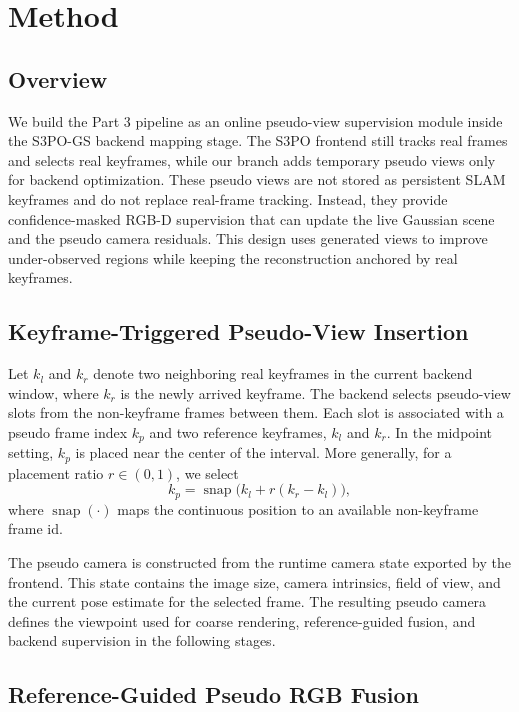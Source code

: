 \section{Method}
\label{sec:method}

\subsection{Overview}
\label{sec:method_overview}

We build the Part 3 pipeline as an online pseudo-view supervision module inside the S3PO-GS backend mapping stage. The S3PO frontend still tracks real frames and selects real keyframes, while our branch adds temporary pseudo views only for backend optimization. These pseudo views are not stored as persistent SLAM keyframes and do not replace real-frame tracking. Instead, they provide confidence-masked RGB-D supervision that can update the live Gaussian scene and the pseudo camera residuals. This design uses generated views to improve under-observed regions while keeping the reconstruction anchored by real keyframes.

\subsection{Keyframe-Triggered Pseudo-View Insertion}
\label{sec:pseudo_slot}

Let $k_l$ and $k_r$ denote two neighboring real keyframes in the current backend window, where $k_r$ is the newly arrived keyframe. The backend selects pseudo-view slots from the non-keyframe frames between them. Each slot is associated with a pseudo frame index $k_p$ and two reference keyframes, $k_l$ and $k_r$. In the midpoint setting, $k_p$ is placed near the center of the interval. More generally, for a placement ratio $r\in(0,1)$, we select
\begin{equation}
k_p = \operatorname{snap}\big(k_l + r(k_r-k_l)\big),
\end{equation}
where $\operatorname{snap}(\cdot)$ maps the continuous position to an available non-keyframe frame id.

The pseudo camera is constructed from the runtime camera state exported by the frontend. This state contains the image size, camera intrinsics, field of view, and the current pose estimate for the selected frame. The resulting pseudo camera defines the viewpoint used for coarse rendering, reference-guided fusion, and backend supervision in the following stages.

\subsection{Reference-Guided Pseudo RGB Fusion}
\label{sec:pseudo_target}

